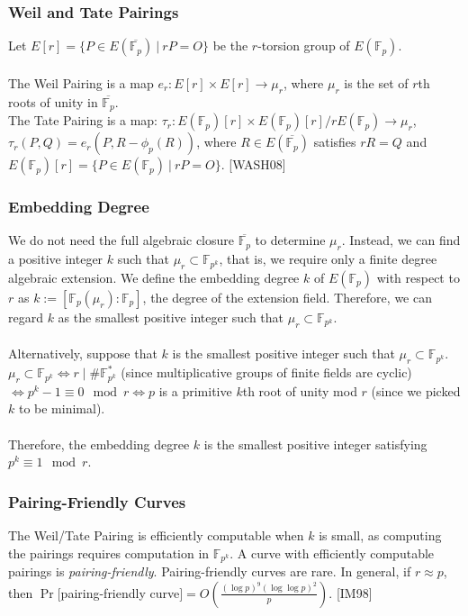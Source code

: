 \documentclass[12pt,twoside]{article}
\newcommand\given[1][]{\:#1\vert\:}
\begin{document}
\subsubsection{Weil and Tate Pairings}
Let $E[r] = \{ P \in E(\overline{\mathbb F_p}) \given rP = O\}$ be the $r$-torsion group of $E(\mathbb F_p)$.
\\ \\
\noindent The Weil Pairing is a map $e_r: E[r] \times E[r] \to \mu_r$, where $\mu_{r}$ is the set of $r$th roots of unity in $\overline{\mathbb F_p}$. \\ 

\noindent The Tate Pairing is a map: $\tau_r: E(\mathbb F_p)[r] \times E(\mathbb F_p)[r]/ rE(\mathbb F_p) \to \mu_r$, $\tau_r(P,Q) = e_r(P, R - \phi_p(R))$, where $R \in E(\overline{\mathbb F_p})$ satisfies $r R = Q$ and $E(\mathbb F_p)[r] = \{P \in E(\mathbb F_p) \given rP = O\}$.  [WASH08]



 \subsubsection{Embedding Degree}
 
We do not need the full algebraic closure $\overline{\mathbb F_p}$ to determine $\mu_r$. Instead, we can find a positive integer $k$ such that $\mu_r \subset \mathbb F_{p^k}$, that is, we require only a finite degree algebraic extension. We define the embedding degree $k$ of $E(\mathbb F_p)$ with respect to $r$ as $k:= [\mathbb F_p(\mu_r) : \mathbb F_p]$, the degree of the extension field. Therefore, we can regard $k$ as the smallest positive integer such that $\mu_r \subset \mathbb F_{p^k}$.
\\ \\
\noindent Alternatively, suppose that $k$ is the smallest positive integer such that $\mu_r \subset \mathbb F_{p^k}$.  $\mu_r \subset \mathbb F_{p^k} 
\iff r \mid  \# %
\mathbb F^*_{p^k}$ (since multiplicative groups of finite fields are cyclic) $ \iff p^k-1 \equiv 0 \mod r \iff p$ is a primitive $k$th root of unity mod $r$ (since we picked $k$ to be minimal). 
\\ \\
\noindent Therefore, the embedding degree $k$ is the smallest positive integer satisfying $p^k \equiv 1 \mod r$.

\subsubsection{Pairing-Friendly Curves}
The Weil/Tate Pairing is efficiently computable when $k$ is small, as computing the pairings requires computation in $\mathbb F_{p^k}$. A curve with efficiently computable pairings is {\it pairing-friendly}. Pairing-friendly curves are rare. In general, if $r \approx p$, then $\Pr[$pairing-friendly curve$] = O(\frac{(\log p)^9 (\log \log p)^2}{p})$. [IM98]
\end{document}
